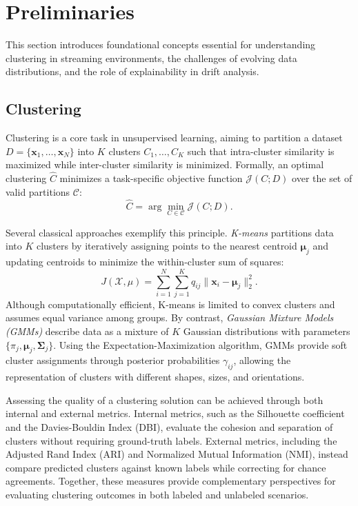 \section{Preliminaries}\label{ch:preliminaries}

This section introduces foundational concepts essential for understanding
clustering in streaming environments, the challenges of evolving data
distributions, and the role of explainability in drift analysis.

\subsection{Clustering}\label{sec:clustering}

Clustering is a core task in unsupervised learning, aiming to partition a
dataset $D = \{\mathbf{x}_1, \dots, \mathbf{x}_N\}$ into $K$ clusters $C_1,
    \dots, C_K$ such that intra-cluster similarity is maximized while inter-cluster
similarity is minimized. Formally, an optimal clustering $\hat{C}$ minimizes a
task-specific objective function $\mathcal{J}(C; D)$ over the set of valid
partitions $\mathcal{C}$:
\[
    \hat{C} = \arg\min_{C \in \mathcal{C}} \mathcal{J}(C; D).
\]

Several classical approaches exemplify this principle. \emph{K-means}
partitions data into $K$ clusters by iteratively assigning points to the
nearest centroid $\boldsymbol{\mu}_j$ and updating centroids to minimize the
within-cluster sum of squares:
\[
    J(\mathcal{X}, \mu) = \sum_{i=1}^{N} \sum_{j=1}^{K} q_{ij} \|\mathbf{x}_i - \boldsymbol{\mu}_j\|_2^2.
\]
Although computationally efficient, K-means is limited to convex clusters and
assumes equal variance among groups. By contrast, \emph{Gaussian Mixture Models
    (GMMs)} describe data as a mixture of $K$ Gaussian distributions with
parameters $\{\pi_j, \boldsymbol{\mu}_j, \mathbf{\Sigma}_j\}$. Using the
Expectation-Maximization algorithm, GMMs provide soft cluster assignments
through posterior probabilities $\gamma_{ij}$, allowing the representation of
clusters with different shapes, sizes, and orientations.

Assessing the quality of a clustering solution can be achieved through both
internal and external metrics. Internal metrics, such as the Silhouette
coefficient and the Davies-Bouldin Index (DBI), evaluate the cohesion and
separation of clusters without requiring ground-truth labels. External metrics,
including the Adjusted Rand Index (ARI) and Normalized Mutual Information
(NMI), instead compare predicted clusters against known labels while correcting
for chance agreements. Together, these measures provide complementary
perspectives for evaluating clustering outcomes in both labeled and unlabeled
scenarios.


